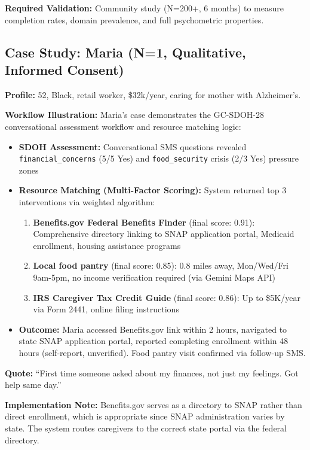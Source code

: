 \documentclass{article}
\begin{document}
\textbf{Required Validation:} Community study (N=200+, 6 months) to measure completion rates, domain prevalence, and full psychometric properties.

%
\subsection{Case Study: Maria (N=1, Qualitative, Informed Consent)}%
\label{subsec:CaseStudyMaria}%
\textbf{Profile:} 52, Black, retail worker, \$32k/year, caring for mother with Alzheimer's.

\textbf{Workflow Illustration:} Maria's case demonstrates the GC-SDOH-28 conversational assessment workflow and resource matching logic:
\begin{itemize}
    \item \textbf{SDOH Assessment:} Conversational SMS questions revealed \texttt{financial\_concerns} (5/5 Yes) and \texttt{food\_security} crisis (2/3 Yes) pressure zones
    \item \textbf{Resource Matching (Multi-Factor Scoring):} System returned top 3 interventions via weighted algorithm:
    \begin{enumerate}
        \item \textbf{Benefits.gov Federal Benefits Finder} (final score: 0.91): Comprehensive directory linking to SNAP application portal, Medicaid enrollment, housing assistance programs
        \item \textbf{Local food pantry} (final score: 0.85): 0.8 miles away, Mon/Wed/Fri 9am-5pm, no income verification required (via Gemini Maps API)
        \item \textbf{IRS Caregiver Tax Credit Guide} (final score: 0.86): Up to \$5K/year via Form 2441, online filing instructions
    \end{enumerate}
    \item \textbf{Outcome:} Maria accessed Benefits.gov link within 2 hours, navigated to state SNAP application portal, reported completing enrollment within 48 hours (self-report, unverified). Food pantry visit confirmed via follow-up SMS.
\end{itemize}

\textbf{Quote:} ``First time someone asked about my finances, not just my feelings. Got help same day.''

\textbf{Implementation Note:} Benefits.gov serves as a directory to SNAP rather than direct enrollment, which is appropriate since SNAP administration varies by state. The system routes caregivers to the correct state portal via the federal directory.
\end{document}
